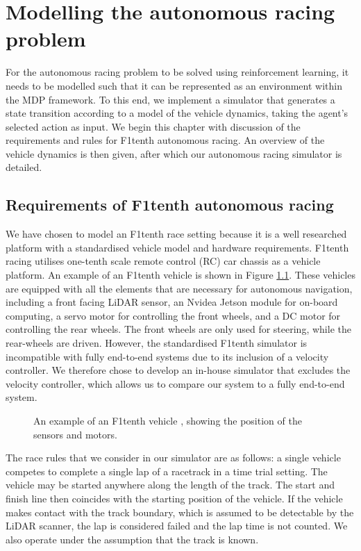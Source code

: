 \chapter{Modelling the autonomous racing problem}
\label{chp:modelling}

For the autonomous racing problem to be solved using reinforcement learning, it needs to be modelled such that it can be represented as an environment within the MDP framework.
To this end, we implement a simulator that generates a state transition according to a model of the vehicle dynamics, taking the agent's selected action as input.
We begin this chapter with discussion of the requirements and rules for F1tenth autonomous racing.
An overview of the vehicle dynamics is then given, after which our autonomous racing simulator is detailed. 


\section{Requirements of F1tenth autonomous racing}\label{sec:f1tenth_requirements}


We have chosen to model an F1tenth race setting because it is a well researched platform with a standardised vehicle model and hardware requirements.
F1tenth racing utilises one-tenth scale remote control (RC) car chassis as a vehicle platform.
An example of an F1tenth vehicle is shown in Figure \ref{fig:sim_vehicle}.
These vehicles are equipped with all the elements that are necessary for autonomous navigation, including a front facing LiDAR sensor, an Nvidea Jetson module for on-board computing, a servo motor for controlling the front wheels, and a DC motor for controlling the rear wheels.
The front wheels are only used for steering, while the rear-wheels are driven.
However, the standardised F1tenth simulator is incompatible with fully end-to-end systems due to its inclusion of a velocity controller.
We therefore chose to develop an in-house simulator that excludes the velocity controller, which allows us to compare our system to a fully end-to-end system.


\begin{figure}[htb!]
    \centering
    
    \caption[The simulated F1tenth vehicle]{An example of an F1tenth vehicle \cite{f1tenth}, showing the position of the sensors and motors.}
    \label{fig:sim_vehicle}
\end{figure}

The race rules that we consider in our simulator are as follows: a single vehicle competes to complete a single lap of a racetrack in a time trial setting.
The vehicle may be started anywhere along the length of the track.
The start and finish line then coincides with the starting position of the vehicle.
If the vehicle makes contact with the track boundary, which is assumed to be detectable by the LiDAR scanner, the lap is considered failed and the lap time is not counted.
We also operate under the assumption that the track is known.


